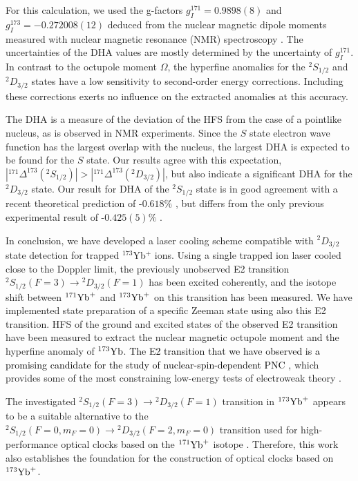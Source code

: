 \documentclass[
reprint,
superscriptaddress,









amsmath,amssymb,
aps,prl






]{revtex4-2}
\newcommand{\m}[1]{\textcolor{black}{#1}}
\begin{document}
For this calculation, we used the g-factors $g^{171}_I = 0.9898(8)$ and $g^{173}_I = -0.272008(12)$ deduced from the nuclear magnetic dipole moments measured with nuclear magnetic resonance (NMR) spectroscopy \cite{stone2014}.
The uncertainties of the DHA values are mostly determined by the uncertainty of $g^{171}_I$. In contrast to the octupole moment $\Omega$, the hyperfine anomalies for the $^2\!S_{1/2}$ and $^2\!D_{3/2}$ states have a low sensitivity to second-order energy corrections.
Including these corrections exerts no influence on the extracted anomalies at this accuracy.

The DHA is a measure of the deviation of the HFS from the case of a pointlike nucleus, as is observed in NMR experiments. Since the $S$ state electron wave function has the largest overlap with the nucleus, the largest DHA is expected to be found for the $S$ state. Our results agree with this expectation,
$|{}^{171}\Delta^{173}(^2\!S_{1/2})| > |{}^{171}\Delta^{173}(^2\!D_{3/2})|$, but also indicate a significant DHA for the $^2\!D_{3/2}$ state.
Our result for DHA of the $^2\!S_{1/2}$ state is in good agreement with a recent theoretical prediction of -$0.618\%$ \cite{Roberts2021}, but differs from the only previous experimental result of -$0.425(5)\%$ \cite{Münch1987}.

In conclusion, we have developed a laser cooling scheme compatible with ${}^2\!D_{3/2}$ state detection for trapped $^{173}$Yb$^+$ ions. Using a single trapped ion laser cooled close to the Doppler limit, the previously unobserved E2 transition $^2\!S_{1/2}(F=3) \rightarrow {}^2\!D_{3/2}(F=1)$ has been excited coherently, and the isotope shift between $^{171}\rm{Yb}^+$ and $^{173}\rm{Yb}^+$ on this transition has been measured. We have implemented state preparation of a specific Zeeman state using also this E2 transition. HFS of the ground and excited states of the observed E2 transition have been measured to extract the nuclear magnetic octupole moment and the hyperfine anomaly of $^{173}\rm{Yb}$. \m{The E2 transition that we have observed is a promising candidate for the study of nuclear-spin-dependent PNC \cite{Dzuba2011, Fortson1993},} which provides some of the most constraining low-energy tests of electroweak theory \cite{Robert2015, Safronova2018}.

The investigated $^2\!S_{1/2}(F=3) \rightarrow {}^2\!D_{3/2}(F=1)$ transition in $^{173}\rm{Yb}^+$ appears to be a suitable alternative to the $^2\!S_{1/2}(F=0,m_F=0) \rightarrow {}^2\!D_{3/2}(F=2,m_F=0)$ transition used for high-performance optical clocks based on the $^{171}\rm{Yb}^+$ isotope \cite{Tamm2014, STUHLER2021}.
Therefore, this work also establishes the foundation for the construction of optical clocks based on $^{173}\rm{Yb}^+$.
\end{document}
